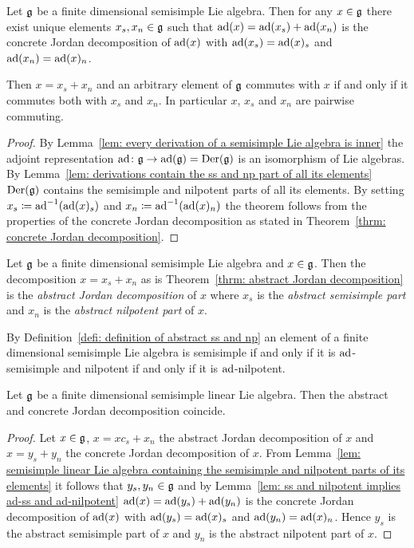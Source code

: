 \begin{theorem} \label{thrm: abstract Jordan decomposition}
 Let $\mathfrak{g}$ be a finite dimensional semisimple Lie algebra. Then for any $x \in \mathfrak{g}$ there exist unique elements $x_s, x_n \in \mathfrak{g}$ such that $\operatorname{ad}(x) = \operatorname{ad}(x_s) + \operatorname{ad}(x_n)$ is the concrete Jordan decomposition of $\operatorname{ad}(x)$ with $\operatorname{ad}(x_s) = \operatorname{ad}(x)_s$ and $\operatorname{ad}(x_n) = \operatorname{ad}(x)_n$.
 
 Then $x = x_s + x_n$ and an arbitrary element of $\mathfrak{g}$ commutes with $x$ if and only if it commutes both with $x_s$ and $x_n$. In particular $x$, $x_s$ and $x_n$ are pairwise commuting.
\end{theorem}
\begin{proof}
 By Lemma~\ref{lem: every derivation of a semisimple Lie algebra is inner} the adjoint representation $\operatorname{ad} \colon \mathfrak{g} \to \operatorname{ad}(\mathfrak{g}) = \operatorname{Der}(\mathfrak{g})$ is an isomorphism of Lie algebras. By Lemma~\ref{lem: derivations contain the ss and np part of all its elements} $\operatorname{Der}(\mathfrak{g})$ contains the semisimple and nilpotent parts of all its elements. By setting $x_s \coloneq \operatorname{ad}^{-1}(\operatorname{ad}(x)_s)$ and $x_n \coloneqq \operatorname{ad}^{-1}(\operatorname{ad}(x)_n)$ the theorem follows from the properties of the concrete Jordan decomposition as stated in Theorem~\ref{thrm: concrete Jordan decomposition}.
\end{proof}


\begin{definition}\label{defi: definition of abstract ss and np}
 Let $\mathfrak{g}$ be a finite dimensional semisimple Lie algebra and $x \in \mathfrak{g}$. Then the decomposition $x = x_s + x_n$ as is Theorem~\ref{thrm: abstract Jordan decomposition} is the \emph{abstract Jordan decomposition} of $x$ where $x_s$ is the \emph{abstract semisimple part} and $x_n$ is the \emph{abstract nilpotent part} of $x$.
\end{definition}


\begin{remark}
 By Definition~\ref{defi: definition of abstract ss and np} an element of a finite dimensional semisimple Lie algebra is semisimple if and only if it is $\operatorname{ad}$-semisimple and nilpotent if and only if it is $\operatorname{ad}$-nilpotent.
\end{remark}


\begin{proposition}\label{prop: abstract and concrete Jordan decomposition coincide}
 Let $\mathfrak{g}$ be a finite dimensional semisimple linear Lie algebra. Then the abstract and concrete Jordan decomposition coincide.
\end{proposition}
\begin{proof}
 Let $x \in \mathfrak{g}$, $x = xc_s + x_n$ the abstract Jordan decomposition of $x$ and $x = y_s + y_n$ the concrete Jordan decomposition of $x$. From Lemma~\ref{lem: semisimple linear Lie algebra containing the semisimple and nilpotent parts of its elements} it follows that $y_s, y_n \in \mathfrak{g}$ and by Lemma~\ref{lem: ss and nilpotent implies ad-ss and ad-nilpotent} $\operatorname{ad}(x) = \operatorname{ad}(y_s) + \operatorname{ad}(y_n)$ is the concrete Jordan decomposition of $\operatorname{ad}(x)$ with $\operatorname{ad}(y_s) = \operatorname{ad}(x)_s$ and $\operatorname{ad}(y_n) = \operatorname{ad}(x)_n$. Hence $y_s$ is the abstract semisimple part of $x$ and $y_n$ is the abstract nilpotent part of $x$.
\end{proof}


